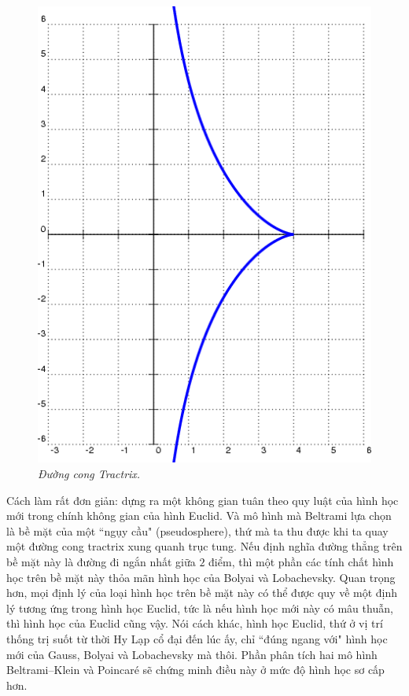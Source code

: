 \begin{multicols}{2}
\begin{figure}[H]
		\includegraphics[width= 1\linewidth]{Tractrix.png}
		\caption{\small\textit{\color{lichsutoanhoc}Đường cong Tractrix.}}
		\vspace*{-10pt}
	\end{figure}
	Cách làm rất đơn giản: dựng ra một không gian tuân theo quy luật của hình học mới trong chính không gian của hình Euclid. Và mô hình mà Beltrami lựa chọn là bề mặt của một ``ngụy cầu" (pseudosphere), thứ mà ta thu được khi ta quay một đường cong tractrix xung quanh trục tung. Nếu định nghĩa đường thẳng trên bề mặt này là đường đi ngắn nhất giữa $2$ điểm, thì một phần các tính chất hình học trên bề mặt này thỏa mãn hình học của Bolyai và Lobachevsky. 
	\vskip 0.1cm
	Quan trọng hơn, mọi định lý của loại hình học trên bề mặt này có thể được quy về một định lý tương ứng trong hình học Euclid, tức là nếu hình học mới này có mâu thuẫn, thì hình học của Euclid cũng vậy. Nói cách khác, hình học Euclid, thứ ở vị trí thống trị suốt từ thời Hy Lạp cổ đại đến lúc ấy, chỉ ``đúng ngang với" hình học mới của Gauss, Bolyai và Lobachevsky mà thôi. Phần phân tích hai mô hình Beltrami--Klein và Poincaré sẽ chứng minh điều này ở mức độ hình học sơ cấp hơn.

\end{multicols}
